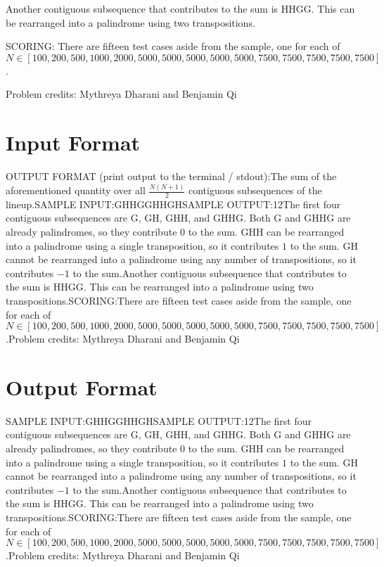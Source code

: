 \documentclass[12pt]{article}
\begin{document}
Another contiguous subsequence that contributes to the sum is HHGG. This can be
rearranged into a palindrome using two transpositions.

SCORING:
There are fifteen test cases aside from the sample, one for each of 
$N \in [100, 200, 500, 1000, 2000, 5000, 5000, 5000, 5000, 5000, 7500, 7500, 7500, 7500, 7500]$.



Problem credits: Mythreya Dharani and Benjamin Qi



\section*{Input Format}
OUTPUT FORMAT (print output to the terminal / stdout):The sum of the aforementioned quantity over all $\frac{N(N+1)}{2}$ contiguous 
subsequences of the lineup.SAMPLE INPUT:GHHGGHHGHSAMPLE OUTPUT:12The first four contiguous subsequences are G, GH, GHH, and GHHG. Both G and GHHG
are already palindromes, so they contribute $0$ to the sum. GHH can be
rearranged into a palindrome using a single transposition, so it contributes $1$
to the sum. GH cannot be rearranged into a palindrome using any number of 
transpositions, so it contributes $-1$ to the sum.Another contiguous subsequence that contributes to the sum is HHGG. This can be
rearranged into a palindrome using two transpositions.SCORING:There are fifteen test cases aside from the sample, one for each of 
$N \in [100, 200, 500, 1000, 2000, 5000, 5000, 5000, 5000, 5000, 7500, 7500, 7500, 7500, 7500]$.Problem credits: Mythreya Dharani and Benjamin Qi

\section*{Output Format}
SAMPLE INPUT:GHHGGHHGHSAMPLE OUTPUT:12The first four contiguous subsequences are G, GH, GHH, and GHHG. Both G and GHHG
are already palindromes, so they contribute $0$ to the sum. GHH can be
rearranged into a palindrome using a single transposition, so it contributes $1$
to the sum. GH cannot be rearranged into a palindrome using any number of 
transpositions, so it contributes $-1$ to the sum.Another contiguous subsequence that contributes to the sum is HHGG. This can be
rearranged into a palindrome using two transpositions.SCORING:There are fifteen test cases aside from the sample, one for each of 
$N \in [100, 200, 500, 1000, 2000, 5000, 5000, 5000, 5000, 5000, 7500, 7500, 7500, 7500, 7500]$.Problem credits: Mythreya Dharani and Benjamin Qi
\end{document}

